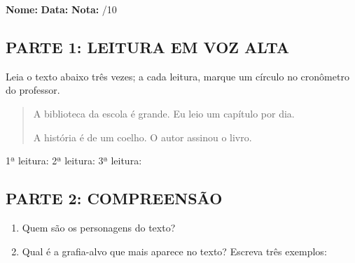 \begin{exercicio}

\noindent\textbf{Nome:} \underline{\hspace{3.2cm}} \quad \textbf{Data:} \underline{\hspace{1.6cm}} \quad \textbf{Nota:} \underline{\hspace{0.9cm}}/10


\subsection*{PARTE 1: LEITURA EM VOZ ALTA}

Leia o texto abaixo três vezes; a cada leitura, marque um círculo no cronômetro do professor.

\begin{quote}
A biblioteca da escola é grande. Eu leio um capítulo por dia.

A história é de um coelho. O autor assinou o livro.
\end{quote}

\begin{center}
1ª leitura: \underline{\hspace{1.5cm}} \quad 2ª leitura: \underline{\hspace{1.5cm}} \quad 3ª leitura: \underline{\hspace{1.5cm}}
\end{center}

\subsection*{PARTE 2: COMPREENSÃO}

\begin{enumerate}

  \item Quem são os personagens do texto?
  \begin{center}
  \underline{\hspace{12cm}}
  \end{center}

  \item Qual é a grafia-alvo que mais aparece no texto? Escreva três exemplos:
  \begin{center}
  \underline{\hspace{3.5cm}} \quad \underline{\hspace{3.5cm}} \quad \underline{\hspace{3.5cm}}
  \end{center}


\end{enumerate}
\end{exercicio}
